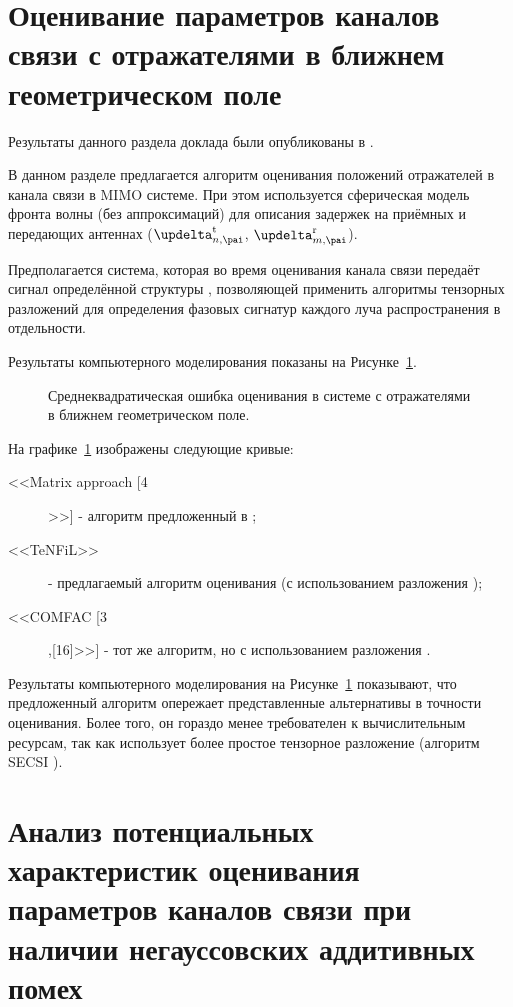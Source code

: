 \section{Оценивание параметров каналов связи с отражателями в ближнем геометрическом поле}\label{ch:ch2/sec2}

Результаты данного раздела доклада были опубликованы в \cite{Podkurkov2018}.

В данном разделе предлагается алгоритм оценивания положений отражателей в канала связи в MIMO системе. При этом используется сферическая модель фронта волны (без аппроксимаций) для описания задержек на приёмных и передающих антеннах ($\deltx$, $\delrx$).

Предполагается система, которая во время оценивания канала связи передаёт сигнал определённой структуры \cite{Singh2017a}, позволяющей применить алгоритмы тензорных разложений \cite{Bros99, Roemer12, Roemer13} для определения фазовых сигнатур каждого луча распространения в отдельности.

Результаты компьютерного моделирования показаны на Рисунке~\ref{fig:ch2/sec2:rmse}.
\begin{figure}[ht]
	\caption{Среднеквадратическая ошибка оценивания в системе с отражателями в ближнем геометрическом поле.}
	\label{fig:ch2/sec2:rmse}
\end{figure}

На графике~\ref{fig:ch2/sec2:rmse} изображены следующие кривые:
\begin{description}
	\item[<<Matrix approach [4]>>] - алгоритм предложенный в \cite{Singh2017a};
	\item[<<TeNFiL>>] - предлагаемый алгоритм оценивания (с использованием разложения \cite{Roemer13});
	\item[<<COMFAC [3],[16]>>] - тот же алгоритм, но с использованием разложения \cite{Bros99}.	
\end{description}

Результаты компьютерного моделирования на Рисунке~\ref{fig:ch2/sec2:rmse} показывают, что предложенный алгоритм опережает представленные альтернативы в точности оценивания. Более того, он гораздо менее требователен к вычислительным ресурсам, так как использует более простое тензорное разложение (алгоритм SECSI \cite{Roemer13}).

\section{Анализ потенциальных характеристик оценивания параметров каналов связи при наличии негауссовских аддитивных помех}\label{ch:ch2/sec3}

